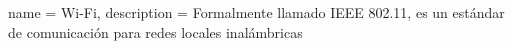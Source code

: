 

	
{
	name = Wi-Fi,
	description = {Formalmente llamado IEEE 802.11, es un estándar de comunicación para redes locales inalámbricas}
}

